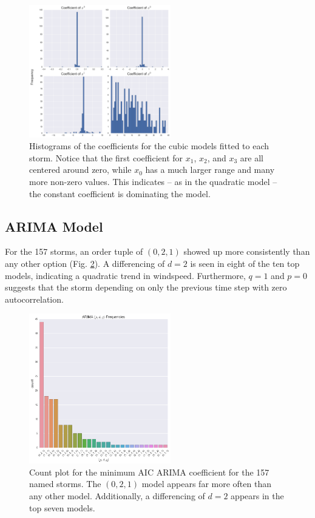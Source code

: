 \documentclass{article}
\begin{document}
	\begin{figure}[H]
			\centering
			\includegraphics[width=0.55\textwidth]{images/cubic.png}
		\caption{Histograms of the coefficients for the cubic models fitted to each storm. Notice that the first coefficient for $x_1$, $x_2$, and $x_3$ are all centered around zero, while $x_0$ has a much larger range and many more non-zero values. This indicates -- as in the quadratic model -- the constant coefficient is dominating the model.}
		\label{cubic}
	\end{figure}

	\subsection{ARIMA Model}
	For the 157 storms, an order tuple of $(0,2,1)$ showed up more consistently than any other option (Fig. \ref{arima}). A differencing of $d=2$ is seen in eight of the ten top models, indicating a quadratic trend in windspeed. Furthermore, $q=1$ and $p=0$ suggests that the storm depending on only the previous time step with zero autocorrelation.
	
	\begin{figure}[t]
			\centering
			\includegraphics[width=0.55\textwidth]{images/arima.png}
		\caption{Count plot for the minimum AIC ARIMA coefficient for the 157 named storms. The $(0,2,1)$ model appears far more often than any other model. Additionally, a differencing of $d = 2$ appears in the top seven models.}
		\label{arima}
	\end{figure}
\end{document}
